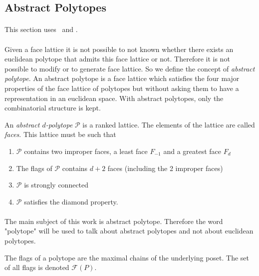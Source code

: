 \subsection{Abstract Polytopes}

\paragraph{}
This section uses~\cite{incidenceGeometry} and \cite{abstractRegularPolytopes}.

\paragraph{}
Given a face lattice it is not possible to not known whether there exists an euclidean polytope that admits this face lattice or not. Therefore it is not possible to modify or to generate face lattice. So we define the concept of \textit{abstract polytope}. An abstract polytope is a face lattice which satisfies the four major properties of the face lattice of polytopes but without asking them to have a representation in an euclidean space. With abstract polytopes, only the combinatorial structure is kept.

\begin{definition}
  An \textit{abstract $d$-polytope} $\mathcal P$ is a ranked lattice. The elements of the lattice are called \textit{faces}. This lattice must be such that
  \begin{enumerate}
    \item $\mathcal P$ contains two improper faces, a least face $F_{-1}$ and a greatest face $F_d$
    \item The flags of $\mathcal P$ contains $d + 2$ faces (including the 2 improper faces)
    \item $\mathcal P$ is strongly connected
    \item $\mathcal P$ satisfies the diamond property.
  \end{enumerate}
\end{definition}

\paragraph{}
The main subject of this work is abstract polytope. Therefore the word "polytope" will be used to talk about abstract polytopes and not about euclidean polytopes.

\begin{definition}
  The flags of a polytope are the maximal chains of the underlying poset. The set of all flags is denoted $\mathcal F(P)$.
\end{definition}


